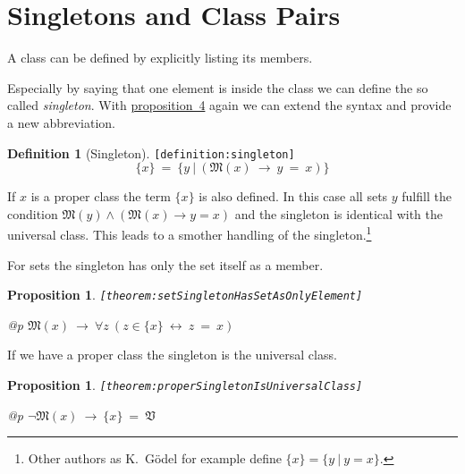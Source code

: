 \documentclass[a4paper,german,10pt,twoside]{book}
\newtheorem{prop}[thm]{Proposition}
\theoremstyle{definition}
\newtheorem{defn}{Definition}
\theoremstyle{remark}
\begin{document}
\section{Singletons and Class Pairs} \label{chapter4_section4} \hypertarget{chapter4_section4}{}
A class can be defined by explicitly listing its members.

\par
Especially by saying that one element is inside the class we can define the so called \emph{singleton}.
With \hyperlink{theorem:comprehension}{proposition~4} again we can extend the syntax and provide a new abbreviation.

\begin{defn}[Singleton]
\label{definition:singleton} \hypertarget{definition:singleton}{}
{\tt \tiny [\verb]definition:singleton]]}
$$\{ x \} \ = \ \{ y \ | \ (\mathfrak{M}(x)\ \rightarrow\ y \ = \ x) \} $$
\end{defn}

If $x$ is a proper class the term $\{x\}$ is also defined. In this case all sets
$y$ fulfill the condition 
$\mathfrak{M}(y) \land (\mathfrak{M}(x) \rightarrow y = x)$ and the singleton is
identical with the universal class. This leads to a smother handling of the
singleton.\footnote{Other authors as K.~G{\"o}del for example define 
$\{x\} = \{y~|~y = x\}$.}


\par
For sets the singleton has only the set itself as a member.

\begin{prop}
\label{theorem:setSingletonHasSetAsOnlyElement} \hypertarget{theorem:setSingletonHasSetAsOnlyElement}{}
{\tt \tiny [\verb]theorem:setSingletonHasSetAsOnlyElement]]}
\mbox{}
\begin{longtable}{{@{\extracolsep{\fill}}p{\linewidth}}}
\centering $\mathfrak{M}(x)\ \rightarrow\ \forall z\ (z \in \{ x \}\ \leftrightarrow\ z \ = \ x)$
\end{longtable}

\end{prop}


\par
If we have a proper class the singleton is the universal class.

\begin{prop}
\label{theorem:properSingletonIsUniversalClass} \hypertarget{theorem:properSingletonIsUniversalClass}{}
{\tt \tiny [\verb]theorem:properSingletonIsUniversalClass]]}
\mbox{}
\begin{longtable}{{@{\extracolsep{\fill}}p{\linewidth}}}
\centering $\neg \mathfrak{M}(x)\ \rightarrow\ \{ x \} \ = \ \mathfrak{V}$
\end{longtable}

\end{prop}
\end{document}
